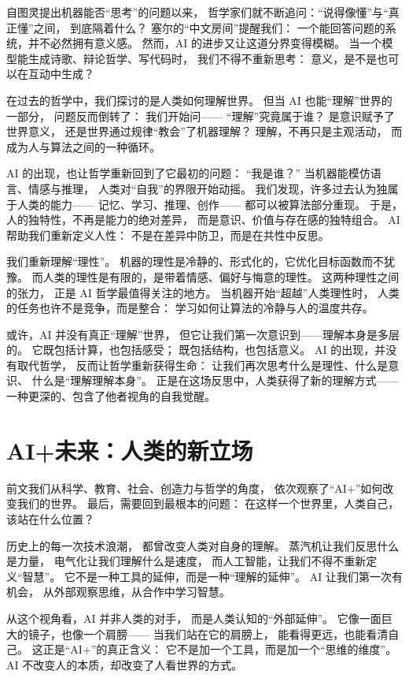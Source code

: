 自图灵提出机器能否“思考”的问题以来，  
哲学家们就不断追问：“说得像懂”与“真正懂”之间，  
到底隔着什么？  
塞尔的“中文房间”提醒我们：  
一个能回答问题的系统，并不必然拥有意义感。  
然而，AI 的进步又让这道分界变得模糊。  
当一个模型能生成诗歌、辩论哲学、写代码时，  
我们不得不重新思考：  
意义，是不是也可以在互动中生成？

在过去的哲学中，我们探讨的是人类如何理解世界。  
但当 AI 也能“理解”世界的一部分，  
问题反而倒转了：  
我们开始问——  
“理解”究竟属于谁？  
是意识赋予了世界意义，  
还是世界通过规律“教会”了机器理解？  
理解，不再只是主观活动，  
而成为人与算法之间的一种循环。

AI 的出现，也让哲学重新回到了它最初的问题：  
“我是谁？”  
当机器能模仿语言、情感与推理，  
人类对“自我”的界限开始动摇。  
我们发现，许多过去认为独属于人类的能力——  
记忆、学习、推理、创作——  
都可以被算法部分重现。  
于是，人的独特性，不再是能力的绝对差异，  
而是意识、价值与存在感的独特组合。  
AI 帮助我们重新定义人性：  
不是在差异中防卫，而是在共性中反思。

我们重新理解“理性”。  
机器的理性是冷静的、形式化的，它优化目标函数而不犹豫。  
而人类的理性是有限的，是带着情感、偏好与悔意的理性。  
这两种理性之间的张力，  
正是 AI 哲学最值得关注的地方。  
当机器开始“超越”人类理性时，  
人类的任务也许不是竞争，而是整合：  
学习如何让算法的冷静与人的温度共存。

或许，AI 并没有真正“理解”世界，  
但它让我们第一次意识到——理解本身是多层的。  
它既包括计算，也包括感受；  
既包括结构，也包括意义。  
AI 的出现，并没有取代哲学，  
反而让哲学重新获得生命：  
让我们再次思考什么是理性、什么是意识、  
什么是“理解理解本身”。  
正是在这场反思中，人类获得了新的理解方式——  
一种更深的、包含了他者视角的自我觉醒。

\section{AI+未来：人类的新立场}
前文我们从科学、教育、社会、创造力与哲学的角度，  
依次观察了“AI+”如何改变我们的世界。  
最后，需要回到最根本的问题：  
在这样一个世界里，人类自己，该站在什么位置？

历史上的每一次技术浪潮，  
都曾改变人类对自身的理解。  
蒸汽机让我们反思什么是力量，  
电气化让我们理解什么是速度，  
而人工智能，让我们不得不重新定义“智慧”。  
它不是一种工具的延伸，而是一种“理解的延伸”。  
AI 让我们第一次有机会，  
从外部观察思维，从合作中学习智慧。

从这个视角看，AI 并非人类的对手，  
而是人类认知的“外部延伸”。  
它像一面巨大的镜子，也像一个肩膀——  
当我们站在它的肩膀上，  
能看得更远，也能看清自己。  
这正是“AI+”的真正含义：  
它不是加一个工具，而是加一个“思维的维度”。  
AI 不改变人的本质，却改变了人看世界的方式。

